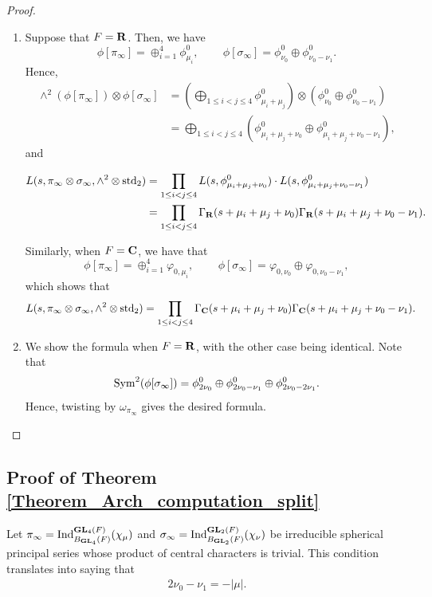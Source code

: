 \documentclass[11pt, reqno]{amsart}
\theoremstyle{plain}
\theoremstyle{definition}
\theoremstyle{remark}
\theoremstyle{plain}
\def\C{{\bf C}}
\def\R{{\bf R}}
\def\GL{\mathbf{GL}}
\begin{document}
\begin{proof}
\begin{enumerate}
    \item Suppose that $F=\R$. Then, we have 
$$\phi[\pi_\infty] = \oplus_{i=1}^4 \phi_{\mu_i}^0, \, \, \,\;\;\;\;\;\; \phi[\sigma_\infty] = \phi^0_{\nu_0} \oplus \phi^0_{\nu_0-\nu_1}.$$
Hence, \begin{align*}
\wedge^2(\phi[\pi_\infty]) \otimes \phi[\sigma_\infty] &= \left(\bigoplus_{1\leq i< j \leq 4} \phi_{\mu_i+\mu_j}^0 \right) \otimes \left (   \phi^0_{\nu_0} \oplus \phi^0_{\nu_0-\nu_1} \right) \\ 
&= \bigoplus_{1\leq i< j \leq 4}\left( \phi_{\mu_i+\mu_j + \nu_0}^0 \oplus \phi_{\mu_i+\mu_j + \nu_0-\nu_1}^0 \right),
\end{align*}
and 

\begin{align*}
L(s, \pi_\infty \otimes \sigma_\infty, \wedge^2 \otimes {\rm std}_2) &=  \prod_{1\leq i< j \leq 4} L(s,\phi_{\mu_i+\mu_j + \nu_0}^0) \cdot L(s, \phi_{\mu_i+\mu_j + \nu_0-\nu_1}^0) \\ 
&= \prod_{1\leq i< j \leq 4} \Gamma_\R(s +\mu_i+\mu_j + \nu_0) \Gamma_\R(s+\mu_i+\mu_j + \nu_0-\nu_1).
\end{align*}

Similarly, when $F= \C$, we have that $$\phi[\pi_\infty] = \oplus_{i=1}^4 \varphi_{0,\mu_i}, \, \, \,\;\;\;\;\;\; \phi[\sigma_\infty] = \varphi_{0,\nu_0} \oplus \varphi_{0,\nu_0-\nu_1},$$
which shows that
\begin{align*}
L(s, \pi_\infty \otimes \sigma_\infty, \wedge^2 \otimes {\rm std}_2) &=  \prod_{1\leq i< j \leq 4} \Gamma_\C(s +\mu_i+\mu_j + \nu_0) \Gamma_\C(s+\mu_i+\mu_j + \nu_0-\nu_1).
\end{align*}
\item  We show the formula when $F = \R$, with the other case being identical.  Note that $$ {\rm Sym}^2(\phi[\sigma_\infty] ) = \phi^0_{2\nu_0} \oplus \phi^0_{2\nu_0-\nu_1} \oplus \phi^0_{2\nu_0-2\nu_1}.$$
Hence, twisting by $\omega_{\pi_\infty}$ gives the desired formula. 
\end{enumerate}
\end{proof}

\subsection{Proof of Theorem \ref{Theorem_Arch_computation_split}}

Let $\pi_\infty = {\rm Ind}_{B_{\GL_4}(F)}^{\GL_4(F)}(\chi_{\mu})$ and $\sigma_\infty = {\rm Ind}_{B_{\GL_2}(F)}^{\GL_2(F)}(\chi_{\nu})$ be irreducible spherical principal series whose product of central characters is trivial. This condition translates into saying that \begin{align}\label{eq:CC}
    2 \nu_0 - \nu_1 = -| \mu|.
\end{align} 
\end{document}
